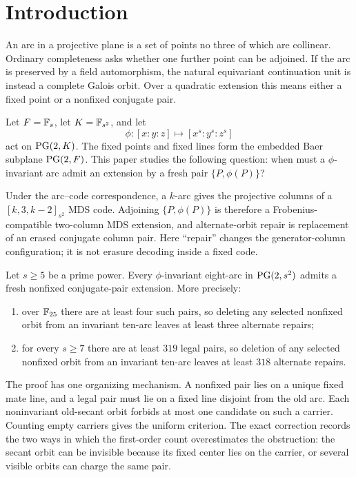 \section{Introduction}

An arc in a projective plane is a set of points no three of which are
collinear.  Ordinary completeness asks whether one further point can be
adjoined.  If the arc is preserved by a field automorphism, the natural
equivariant continuation unit is instead a complete Galois orbit.  Over a
quadratic extension this means either a fixed point or a nonfixed conjugate
pair.

Let $F=\mathbb{F}_s$, let $K=\mathbb{F}_{s^2}$, and let
\[
  \phi\colon [x:y:z]\longmapsto[x^s:y^s:z^s]
\]
act on $\operatorname{PG}(2,K)$.  The fixed points and fixed lines form the embedded Baer
subplane $\operatorname{PG}(2,F)$.  This paper studies the following question: when must a
$\phi$-invariant arc admit an extension by a fresh pair
$\{P,\phi(P)\}$?

Under the arc--code correspondence, a $k$-arc gives the projective columns
of a $[k,3,k-2]_{s^2}$ MDS code.  Adjoining $\{P,\phi(P)\}$ is therefore a
Frobenius-compatible two-column MDS extension, and alternate-orbit repair is
replacement of an erased conjugate column pair.  Here ``repair'' changes the
generator-column configuration; it is not erasure decoding inside a fixed
code.

\begin{theorem}
\label{thm:main}
Let $s\ge5$ be a prime power.  Every $\phi$-invariant eight-arc in
$\operatorname{PG}(2,s^2)$ admits a fresh nonfixed conjugate-pair extension.  More
precisely:
\begin{enumerate}[label=(\roman*),leftmargin=2.1em]
\item over $\mathbb{F}_{25}$ there are at least four such pairs, so deleting any
      selected nonfixed orbit from an invariant ten-arc leaves at least
      three alternate repairs;
\item for every $s\ge7$ there are at least $319$ legal pairs, so deletion of
      any selected nonfixed orbit from an invariant ten-arc leaves at least
      $318$ alternate repairs.
\end{enumerate}
\end{theorem}

The proof has one organizing mechanism.  A nonfixed pair lies on a unique
fixed mate line, and a legal pair must lie on a fixed line disjoint from the
old arc.  Each noninvariant old-secant orbit forbids at most one candidate on
such a carrier.  Counting empty carriers gives the uniform criterion.  The
exact correction records the two ways in which the first-order count
overestimates the obstruction: the secant orbit can be invisible because
its fixed center lies on the carrier, or several visible orbits can charge
the same pair.


